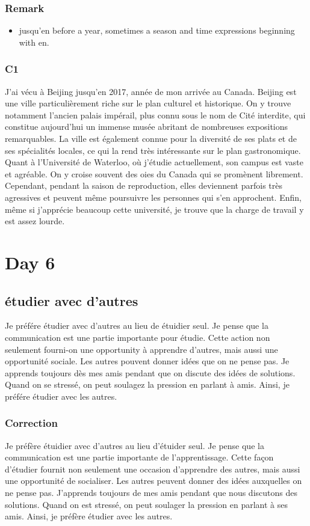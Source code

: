 \documentclass{book}
\begin{document}
    \subsection{Remark}
        \begin{itemize}
            \item jusqu'en before a year, sometimes a season and time expressions beginning with en.
        \end{itemize}

    \subsection{C1}
        J'ai vécu à Beijing jusqu'en 2017, année de mon arrivée au Canada. 
        Beijing est une ville particulièrement riche sur le plan culturel et historique.
        On y trouve notamment l'ancien palais impérail, plus connu sous le nom de Cité interdite, qui constitue aujourd'hui un immense musée abritant de nombreuses expositions remarquables.
        La ville est également connue pour la diversité de ses plats et de ses spécialités locales, ce qui la rend très intéressante sur le plan gastronomique.
        Quant à l'Université de Waterloo, où j'étudie actuellement, son campus est vaste et agréable. On y croise souvent des oies du Canada qui se promènent librement.
        Cependant, pendant la saison de reproduction, elles deviennent parfois très agressives et peuvent même poursuivre les personnes qui s'en approchent.
        Enfin, même si j'apprécie beaucoup cette université, je trouve que la charge de travail y est assez lourde.

\chapter{Day 6}
    \section{étudier avec d'autres}
        Je préfére étudier avec d'autres au lieu de étuidier seul. 
        Je pense que la communication est une partie importante pour étudie.
        Cette action non seulement fourni-on une opportunity à apprendre d'autres, mais aussi une opportunité sociale.
        Les autres pouvent donner idées que on ne pense pas. 
        Je apprends toujours dès mes amis pendant que on discute des idées de solutions.
        Quand on se stressé, on peut soulagez la pression en parlant à amis.
        Ainsi, je préfére étudier avec les autres.
    \subsection{Correction}
        Je préfère étuidier avec d'autres au lieu d'étuider seul.
        Je pense que la communication est une partie importante de l'apprentissage.
        Cette façon d'étudier fournit non seulement une occasion d'apprendre des autres,
        mais aussi une opportunité de socialiser.
        Les autres peuvent donner des idées auxquelles on ne pense pas.
        J'apprends toujours de mes amis pendant que nous discutons des solutions.
        Quand on est stressé, on peut soulager la pression en parlant à ses amis.
        Ainsi, je préfère étudier avec les autres.
\end{document}
